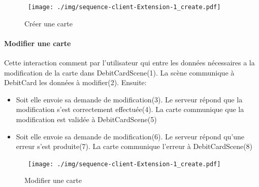 \documentclass{article}
\begin{document}
\begin{figure}[h!]
    \hbox{
        \centering\texttt{[image: ./img/sequence-client-Extension-1\_create.pdf]}
    }
    \caption{Créer une carte}
\end{figure}

\newpage

\paragraph{Modifier une carte}

Cette interaction comment par l'utilisateur qui entre les données nécessaires a la modification
de la carte dans DebitCardScene(1). La scène communique à DebitCard les données à modifier(2).
\newline
Ensuite:
\begin{itemize}
    \item Soit elle envoie sa demande de modification(3). Le serveur répond que la modification s'est correctement
    effectuée(4). La carte communique que la modification est validée à DebitCardScene(5)
    \item Soit elle envoie sa demande de modification(6). Le serveur répond qu'une erreur s'est produite(7).
     La carte communique l'erreur à DebitCardScene(8)
\end{itemize}

\begin{figure}[h!]
    \hbox{
        \centering\texttt{[image: ./img/sequence-client-Extension-1\_create.pdf]}
    }
    \caption{Modifier une carte}
\end{figure}
\end{document}

